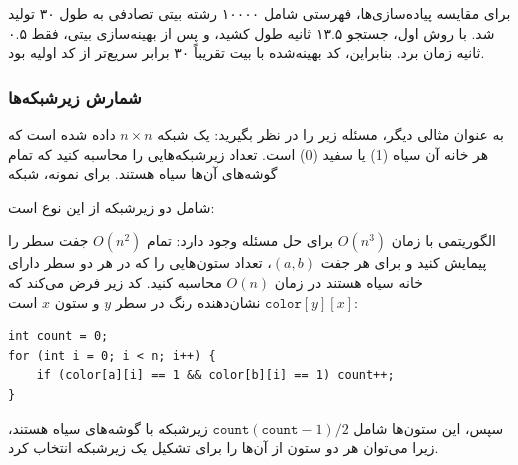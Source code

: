 برای مقایسه پیاده‌سازی‌ها، فهرستی شامل ۱۰۰۰۰
رشته بیتی تصادفی به طول ۳۰ تولید شد.
با روش اول، جستجو ۱۳.۵ ثانیه طول کشید،
و پس از بهینه‌سازی بیتی،
فقط ۰.۵ ثانیه زمان برد.
بنابراین، کد بهینه‌شده با بیت تقریباً
۳۰ برابر سریع‌تر از کد اولیه بود.

\subsubsection{شمارش زیرشبکه‌ها}

به عنوان مثالی دیگر، مسئله زیر را در نظر بگیرید:
یک شبکه $n \times n$ داده شده است که
هر خانه آن سیاه (1) یا سفید (0) است.
تعداد زیرشبکه‌هایی را محاسبه کنید
که تمام گوشه‌های آن‌ها سیاه هستند.
برای نمونه، شبکه
\begin{center}
\end{center}
شامل دو زیرشبکه از این نوع است:
\begin{center}
\end{center}

الگوریتمی با زمان $O(n^3)$ برای حل مسئله وجود دارد:
تمام $O(n^2)$ جفت سطر را پیمایش کنید و برای هر جفت
$(a,b)$، تعداد ستون‌هایی را که در هر دو سطر دارای خانه سیاه
هستند در زمان $O(n)$ محاسبه کنید.
کد زیر فرض می‌کند که $\texttt{color}[y][x]$
نشان‌دهنده رنگ در سطر $y$ و ستون $x$ است:
\begin{lstlisting}
int count = 0;
for (int i = 0; i < n; i++) {
    if (color[a][i] == 1 && color[b][i] == 1) count++;
}
\end{lstlisting}
سپس، این ستون‌ها
شامل $\texttt{count}(\texttt{count}-1)/2$ زیرشبکه با گوشه‌های سیاه هستند،
زیرا می‌توان هر دو ستون از آن‌ها را برای تشکیل یک زیرشبکه انتخاب کرد.

